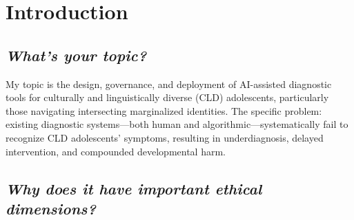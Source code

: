 \documentclass[12pt,a4paper]{article}
\begin{document}
\begin{abstract}
The central thesis is that diagnostic AI must be treated as a justice-critical institution with enforceable equity requirements, not optional enhancements. If documented diagnostic harm concentrates in CLD populations—a reality my ED415 research confirms—and those populations carry historical legacies of medical neglect and racialized dismissal, then precaution is not perfectionism—it is a basic safety stance. EQUITAS operationalizes this principle through explicit performance thresholds (equalized-odds gaps $\leq 3\%$, true-positive-rate ratios $0.9$--$1.1$), mandatory community veto authority, continuous monitoring with automatic escalation and suspension protocols, and public harm ledgers that document where benefits and harms fall.

\vspace{0.5em}


\end{abstract}

\clearpage
\footnotesize\tableofcontents
\clearpage

\section{Introduction}

\subsection*{\textit{What's your topic?}}

My topic is the design, governance, and deployment of AI-assisted diagnostic tools for culturally and linguistically diverse (CLD) adolescents, particularly those navigating intersecting marginalized identities. The specific problem: existing diagnostic systems—both human and algorithmic—systematically fail to recognize CLD adolescents' symptoms, resulting in underdiagnosis, delayed intervention, and compounded developmental harm.

\subsection*{\textit{Why does it have important ethical dimensions?}}
\end{document}

